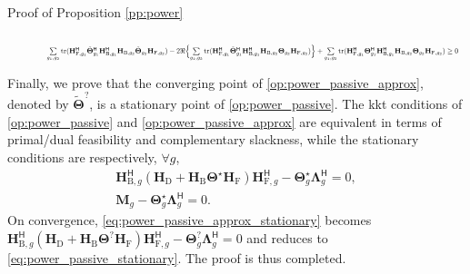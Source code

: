\documentclass[journal]{IEEEtran}
\begin{document}
\begin{appendix}
\begin{subsection}{Proof of Proposition \ref{pp:power}}
\begin{figure}
\begin{equation}
{				}
			\end{equation}
			\begin{equation}
				\label{iq:nonnegative_norm_square}
				\resizebox{0.95\textwidth}{!}{
					$\sum\limits_{g_1,g_2} \mathrm{tr}(\mathbf{H}_{\mathrm{F},g_1}^\mathsf{H} \tilde{\mathbf{\Theta}}_{g_1}^\mathsf{H} \mathbf{H}_{\mathrm{B},g_1}^\mathsf{H} \mathbf{H}_{\mathrm{B},g_2} \tilde{\mathbf{\Theta}}_{g_2} \mathbf{H}_{\mathrm{F},g_2}) - 2 \Re \Bigl\{\sum\limits_{g_1,g_2} \mathrm{tr}(\mathbf{H}_{\mathrm{F},g_1}^\mathsf{H} \tilde{\mathbf{\Theta}}_{g_1}^\mathsf{H} \mathbf{H}_{\mathrm{B},g_1}^\mathsf{H} \mathbf{H}_{\mathrm{B},g_2} \mathbf{\Theta}_{g_2} \mathbf{H}_{\mathrm{F},g_2})\Bigr\} + \sum\limits_{g_1,g_2} \mathrm{tr}(\mathbf{H}_{\mathrm{F},g_1}^\mathsf{H} {\mathbf{\Theta}}_{g_1}^\mathsf{H} \mathbf{H}_{\mathrm{B},g_1}^\mathsf{H} \mathbf{H}_{\mathrm{B},g_2} {\mathbf{\Theta}}_{g_2} \mathbf{H}_{\mathrm{F},g_2}) \ge 0$
				}
			\end{equation}
			\hrulefill
		\end{figure}

		Finally, we prove that the converging point of \eqref{op:power_passive_approx}, denoted by $\tilde{\mathbf{\Theta}}^?$, is a stationary point of \eqref{op:power_passive}.
		The \gls{kkt} conditions of \eqref{op:power_passive} and \eqref{op:power_passive_approx} are equivalent in terms of primal/dual feasibility and complementary slackness, while the stationary conditions are respectively, $\forall g$,
		\begin{gather}
			\mathbf{H}_{\mathrm{B},g}^\mathsf{H} (\mathbf{H}_\mathrm{D} + \mathbf{H}_\mathrm{B} \mathbf{\Theta}^\star \mathbf{H}_\mathrm{F}) \mathbf{H}_{\mathrm{F},g}^\mathsf{H} - \mathbf{\Theta}_g^\star \mathbf{\Lambda}_g^\mathsf{H} = 0,\label{eq:power_passive_stationary}\\
			\mathbf{M}_g - \mathbf{\Theta}_g^\star \mathbf{\Lambda}_g^\mathsf{H} = 0.\label{eq:power_passive_approx_stationary}
		\end{gather}
		On convergence, \eqref{eq:power_passive_approx_stationary} becomes $\mathbf{H}_{\mathrm{B},g}^\mathsf{H} (\mathbf{H}_\mathrm{D} + \mathbf{H}_\mathrm{B} \mathbf{\Theta}^? \mathbf{H}_\mathrm{F}) \mathbf{H}_{\mathrm{F},g}^\mathsf{H} - \mathbf{\Theta}_g^? \mathbf{\Lambda}_g^\mathsf{H} = 0$ and reduces to \eqref{eq:power_passive_stationary}.
		The proof is thus completed.
	\end{subsection}
\end{appendix}
\end{document}
